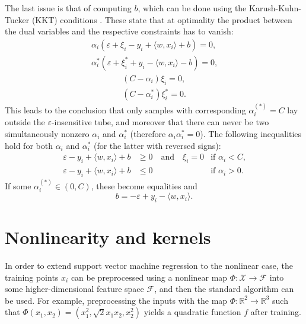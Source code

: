 \documentclass[12pt]{report}
\begin{document}
The last issue is that of computing $b$, which can be done using the Karush-Kuhn-Tucker (KKT) conditions \cite{karush39,kuhntucker51}. These state that at optimality the product between the dual variables and the respective constraints has to vanish:
\begin{equation} \label{kkt1}
\begin{split}
\alpha_{i}(\varepsilon + \xi_{i} - y_{i} + \langle w,x_{i}\rangle + b) = 0 \text{,}\\
\alpha_{i}^{*}(\varepsilon + \xi_{i}^{*} + y_{i} - \langle w,x_{i}\rangle - b) = 0 \text{,}
\end{split}
\end{equation}
\begin{equation} \label{kkt2}
\begin{split}
(C - \alpha_{i})\xi_{i} = 0 \text{,}\\
(C - \alpha_{i}^{*})\xi_{i}^{*} = 0 \text{.}
\end{split}
\end{equation}
This leads to the conclusion that only samples with corresponding  $\alpha_{i}^{(*)}=C$ lay outside the $\varepsilon$-insensitive tube, and moreover that there can never be two simultaneously nonzero $\alpha_{i}$ and $\alpha_{i}^{*}$ (therefore $\alpha_{i}\alpha_{i}^{*} = 0$). The following inequalities hold for both $\alpha_{i}$ and $\alpha_{i}^{*}$ (for the latter with reversed signs):
\begin{align}
\label{compb1}
\varepsilon - y_{i} + \langle w,x_{i}\rangle + b &\geq 0 \quad \text{and} \quad \xi_{i}=0 &\text{if } \alpha_{i} < C \text{,}\\
\label{compb2}
\varepsilon - y_{i} + \langle w,x_{i}\rangle + b &\leq 0 &\text{if } \alpha_{i} > 0 \text{.}
\end{align}
If some $\alpha_{i}^{(*)} \in (0,C)$, these become equalities and
\begin{equation} \label{compb3}
b = - \varepsilon + y_{i} - \langle w,x_{i}\rangle \text{.}
\end{equation}

\section{Nonlinearity and kernels}
In order to extend support vector machine regression to the nonlinear case, the training points $ x_{i} $ can be preprocessed using a nonlinear map $ \Phi : \mathcal{X} \rightarrow \mathcal{F} $ into some higher-dimensional feature space $ \mathcal{F} $, and then the standard algorithm can be used. For example, preprocessing the inputs with the map $ \Phi : \mathbb{R}^{2} \rightarrow \mathbb{R}^{3} $ such that $ \Phi(x_{1},x_{2}) = (x_{1}^{2},\sqrt{2}x_{1}x_{2},x_{2}^{2}) $ yields a quadratic function $ f $ after training.
\end{document}
